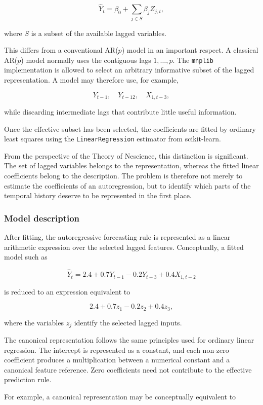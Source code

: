 \[
\widehat Y_t
=
\beta_0
+
\sum_{j\in S}
\beta_j Z_{j,t},
\]

where \(S\) is a subset of the available lagged variables.

This differs from a conventional AR(\(p\)) model in an important respect. A
classical AR(\(p\)) model normally uses the contiguous lags
\(1,\ldots,p\). The \texttt{mnplib} implementation is allowed to select an
arbitrary informative subset of the lagged representation. A model may therefore
use, for example,

\[
Y_{t-1},\quad Y_{t-12},\quad X_{1,t-3},
\]

while discarding intermediate lags that contribute little useful information.

Once the effective subset has been selected, the coefficients are fitted by
ordinary least squares using the \texttt{LinearRegression} estimator from
scikit-learn.

From the perspective of the Theory of Nescience, this distinction is
significant. The set of lagged variables belongs to the representation, whereas
the fitted linear coefficients belong to the description. The problem is
therefore not merely to estimate the coefficients of an autoregression, but to
identify which parts of the temporal history deserve to be represented in the
first place.

\subsubsection{Model description}

After fitting, the autoregressive forecasting rule is represented as a linear
arithmetic expression over the selected lagged features. Conceptually, a fitted
model such as

\[
\widehat Y_t
=
2.4
+
0.7Y_{t-1}
-
0.2Y_{t-3}
+
0.4X_{1,t-2}
\]

is reduced to an expression equivalent to

\[
2.4
+
0.7z_1
-
0.2z_2
+
0.4z_3,
\]

where the variables \(z_j\) identify the selected lagged inputs.

The canonical representation follows the same principles used for ordinary
linear regression. The intercept is represented as a constant, and each non-zero
coefficient produces a multiplication between a numerical constant and a
canonical feature reference. Zero coefficients need not contribute to the
effective prediction rule.

For example, a canonical representation may be conceptually equivalent to

